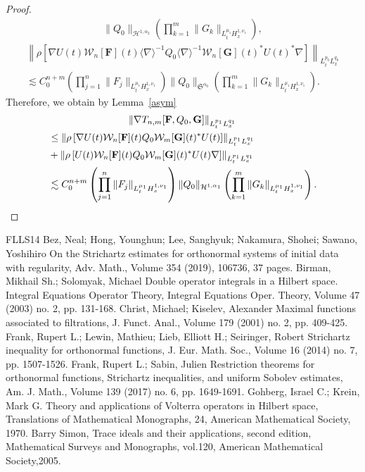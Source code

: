 \documentclass[10pt]{amsart}
\newcommand{\No}[1]{}
\theoremstyle{definition}
\numberwithin{equation}{section}
\newcommand{\vF}{{\mathbf{F}}}
\newcommand{\vG}{{\mathbf{G}}}
\newcommand{\CH}{\mathcal{H}}
\newcommand{\CW}{\mathcal{W}}
\newcommand{\FS}{\mathfrak{S}}
\newcommand{\al}{\alpha}
\newcommand{\rh}{\rho}
\newcommand{\Dk}[1]{\left[#1\right]}
\newcommand{\K}[1]{\left(#1\right)}
\renewcommand{\No}[1]{\left\| #1 \right\|}
\newcommand{\sd}{\langle \nabla \rangle}
\newcommand{\sdi}{\sd^{-1}}
\newcommand{\na}{\nabla}
\newcommand{\ls}{\lesssim}
\begin{document}
\begin{proof}
\begin{multline}
\|Q_0\|_{\CH^{1,\al_2}}
\K{\prod_{k=1}^ m\|G_k\|_{L^{\mu_1}_t H^{1,\nu_1}_x}}, 
\end{multline}
\begin{multline}\label{deriv L2}
\left\|\rh\Dk{\na U(t)\CW_n[\vF](t) \sdi Q_0 \sdi \CW_n[\vG](t)^* U(t)^* \na} \right\|_{L^{p_0}_t L^{q_0}_x} \\
\ls C_0^{n+m} \K{\prod_{j=1}^n \|F_j\|_{L^{\mu_1}_t H^{1,\nu_1}_x}}
\|Q_0\|_{\FS^{\al_0}}
\K{\prod_{k=1}^m \|G_k\|_{L^{\mu_1}_t H^{1,\nu_1}_x}}. 
\end{multline}
Therefore, we obtain by Lemma~\ref{asym}
\begin{multline}
\left\|\na T_{n,m}[\vF,Q_0,\vG]\right\|_{L^{p_1}_t L^{q_1}_x} \\
\begin{aligned}
&\le \No{\rh \Dk{\na U(t) \CW_n[\vF](t) Q_0 \CW_m[\vG](t)^* U(t)}}_{L^{p_1}_t L^{q_1}_x} \\
&+ \No{\rh \Dk{U(t) \CW_n[\vF](t) Q_0 \CW_m[\vG](t)^* U(t) \na}}_{L^{p_1}_t L^{q_1}_x} \\
&\ls C_0^{n+m} \K{\prod_{j=1}^n \|F_j\|_{L^{\mu_1}_t H^{1,\nu_1}_x}} \|Q_0\|_{\CH^{1,\al_1}} \K{\prod_{k=1}^m \|G_k\|_{L^{\mu_1}_t H^{1,\nu_1}_x}}.\qedhere
\end{aligned}
\end{multline}
\end{proof}

\begin{thebibliography}{FLLS14}
 Bez, Neal; Hong, Younghun; Lee, Sanghyuk; Nakamura, Shohei; Sawano, Yoshihiro On the Strichartz estimates for orthonormal systems of initial data with regularity, Adv. Math., Volume 354 (2019), 106736, 37 pages.
 Birman, Mikhail Sh.; Solomyak, Michael Double operator integrals in a Hilbert space. Integral Equations Operator Theory, Integral Equations Oper. Theory, Volume 47 (2003) no. 2, pp. 131-168.
 Christ, Michael; Kiselev, Alexander Maximal functions associated to filtrations, J. Funct. Anal., Volume 179 (2001) no. 2, pp. 409-425.
 Frank, Rupert L.; Lewin, Mathieu; Lieb, Elliott H.; Seiringer, Robert Strichartz inequality for orthonormal functions, J. Eur. Math. Soc., Volume 16 (2014) no. 7, pp. 1507-1526.
 Frank, Rupert L.; Sabin, Julien Restriction theorems for orthonormal functions, Strichartz inequalities, and uniform Sobolev estimates, Am. J. Math., Volume 139 (2017) no. 6, pp. 1649-1691.
 Gohberg, Israel C.; Krein, Mark G. Theory and applications of Volterra operators in Hilbert space, Translations of Mathematical Monographs, 24, American Mathematical Society, 1970.
 Barry Simon, Trace ideals and their applications, second edition, Mathematical Surveys and Monographs, vol.120, American Mathematical Society,2005.
\end{thebibliography}
\end{document}
